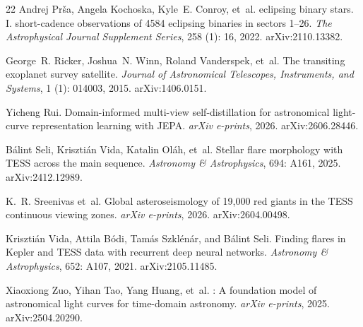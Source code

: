 \documentclass{article}
\providecommand{\DIFaddtex}[1]{{\protect\color{blue}\uwave{#1}}} %
\providecommand{\DIFaddbegin}{} %
\providecommand{\DIFadd}[1]{\texorpdfstring{\DIFaddtex{#1}}{#1}} %
\providecommand{\DIFaddincludegraphics}[2][]{{\color{blue}\fbox{\DIFOincludegraphics[#1]{#2}}}} %
\DeclareRobustCommand{\DIFaddbegin}{\DIFOaddbegin \let\includegraphics\DIFaddincludegraphics} %
\begin{document}
\begin{thebibliography}{22}
Andrej Pr\v{s}a, Angela Kochoska, Kyle~E. Conroy, et~al.
 eclipsing binary stars. {I}. short-cadence observations of
  4584 eclipsing binaries in sectors 1--26.
\newblock \emph{The Astrophysical Journal Supplement Series}, 258
  (1): 16, 2022.
\newblock arXiv:2110.13382.

George~R. Ricker, Joshua~N. Winn, Roland Vanderspek, et~al.
\newblock The transiting exoplanet survey satellite.
\newblock \emph{Journal of Astronomical Telescopes, Instruments, and Systems},
  1 (1): 014003, 2015.
\newblock arXiv:1406.0151.

Yicheng Rui.
\newblock Domain-informed multi-view self-distillation for astronomical
  light-curve representation learning with {JEPA}.
\newblock \emph{arXiv e-prints}, 2026.
\newblock arXiv:2606.28446.

B\'{a}lint Seli, Kriszti\'{a}n Vida, Katalin Ol\'{a}h, et~al.
\newblock Stellar flare morphology with {TESS} across the main sequence.
\newblock \emph{Astronomy \& Astrophysics}, 694: A161, 2025.
\newblock arXiv:2412.12989.

K.~R. Sreenivas et~al.
\newblock Global asteroseismology of 19,000 red giants in the {TESS} continuous
  viewing zones.
\newblock \emph{arXiv e-prints}, 2026.
\newblock arXiv:2604.00498.

Kriszti\'{a}n Vida, Attila B\'{o}di, Tam\'{a}s Szkl\'{e}n\'{a}r, and B\'{a}lint
  Seli.
\newblock Finding flares in {Kepler} and {TESS} data with recurrent deep neural
  networks.
\newblock \emph{Astronomy \& Astrophysics}, 652: A107, 2021.
\newblock arXiv:2105.11485.

Xiaoxiong Zuo, Yihan Tao, Yang Huang, et~al.
: A foundation model of astronomical light curves for
  time-domain astronomy.
\newblock \emph{arXiv e-prints}, 2025.
\newblock arXiv:2504.20290.

\end{thebibliography}


\appendix

\DIFaddbegin \section{\DIFadd{Pre-training and readout details}}
\label{app:training}
\end{document}
